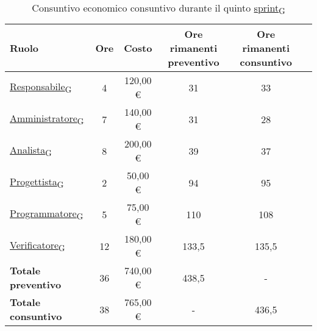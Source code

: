  \begin{table}[!h]
     \centering
     \begin{tabular}{ | l | c | c | c | c | c | }
         \hline
         \textbf{Ruolo} & \textbf{Ore} & \textbf{Costo} & \textbf{Ore rimanenti preventivo} & \textbf{Ore rimanenti consuntivo} \\
         \hline
         \href{https://7last.github.io/docs/rtb/documentazione-interna/glossario\#responsabile}{Responsabile\textsubscript{G}}               &  4   &    120,00 € &   31   &   33   \\
         \href{https://7last.github.io/docs/rtb/documentazione-interna/glossario\#amministratore}{Amministratore\textsubscript{G}}             &  7   &    140,00 € &   31   &   28   \\
         \href{https://7last.github.io/docs/rtb/documentazione-interna/glossario\#analista}{Analista\textsubscript{G}}                   &  8   &    200,00 € &   39   &   37   \\
         \href{https://7last.github.io/docs/rtb/documentazione-interna/glossario\#progettista}{Progettista\textsubscript{G}}                &  2   &    50,00 € &   94   &   95   \\
         \href{https://7last.github.io/docs/rtb/documentazione-interna/glossario\#programmatore}{Programmatore\textsubscript{G}}              &  5   &    75,00 € &   110   &   108   \\
         \href{https://7last.github.io/docs/rtb/documentazione-interna/glossario\#verificatore}{Verificatore\textsubscript{G}}               &  12   &    180,00 € &   133,5   &   135,5   \\
         \hline
         \textbf{Totale preventivo} &  36   &    740,00 € &   438,5   &   -   \\
         \hline
         \textbf{Totale consuntivo} &  38   &    765,00 € &   -   &   436,5   \\
         \hline
     \end{tabular}
     \caption{Consuntivo economico consuntivo durante il quinto \href{https://7last.github.io/docs/rtb/documentazione-interna/glossario\#sprint}{sprint\textsubscript{G}}}
 \end{table}
\newpage
